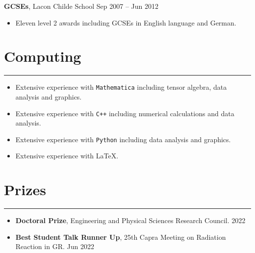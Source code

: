 \documentclass[10.5pt, oneside]{article}   	%
\begin{document}
\textbf{GCSEs}, Lacon Childe School \hfill Sep 2007 -- Jun 2012\\
\vspace{-5mm}
\begin{itemize}
\item Eleven level 2 awards including GCSEs in English language and German.
\end{itemize} 

 {\color{Sectioncolour}
\section*{Computing}
\vspace{-3mm}
\noindent\rule{\linewidth}{0.6pt}}
 \begin{itemize}
\item Extensive experience with \texttt{Mathematica} including tensor algebra, data analysis and graphics. 
\item Extensive experience with \texttt{C++} including numerical calculations and data analysis.
\item Extensive experience with \texttt{Python} including data analysis and graphics. 
\item Extensive experience with \LaTeX.
\end{itemize}


{\color{Sectioncolour}
\section*{Prizes}
\vspace{-3mm}
\noindent\rule{\linewidth}{0.6pt}}
\begin{itemize}
\item \textbf{Doctoral Prize}, Engineering and Physical Sciences Research Council. \hfill 2022
\item \textbf{Best Student Talk Runner Up}, 25th Capra Meeting on Radiation Reaction in GR. \hfill Jun 2022 
\end{itemize}
 
\end{document}
